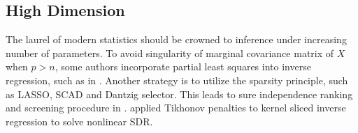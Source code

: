 \subsection{High Dimension}

The laurel of modern statistics should be crowned to inference under
increasing number of parameters. To avoid singularity of marginal
covariance matrix of $X$ when $p>n$, some authors incorporate partial
least squares into inverse regression, such as in \citet{li2007partial,cook2007dimension,zhu2009distribution,zhu2010dimension}.
Another strategy is to utilize the sparsity principle, such as LASSO,
SCAD and Dantzig selector. This leads to sure independence ranking
and screening procedure in \citet{zhu2011model}. \citet{wu2008consistency}
applied Tikhonov penalties to kernel sliced inverse regression to
solve nonlinear SDR. %
\begin{comment}
add wuchang bao setting consistency and normalty proof
\end{comment}



